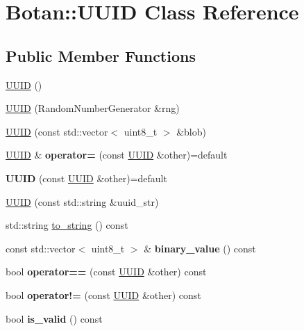 \hypertarget{class_botan_1_1_u_u_i_d}{}\section{Botan\+:\+:U\+U\+ID Class Reference}
\label{class_botan_1_1_u_u_i_d}
\subsection*{Public Member Functions}
\begin{DoxyCompactItemize}
\item 
\mbox{\hyperlink{class_botan_1_1_u_u_i_d_a1e8e37568ead09e587ca96cebcbab9d2}{U\+U\+ID}} ()
\item 
\mbox{\hyperlink{class_botan_1_1_u_u_i_d_a97713e2316b1c612813bb03c66dcbbb6}{U\+U\+ID}} (Random\+Number\+Generator \&rng)
\item 
\mbox{\hyperlink{class_botan_1_1_u_u_i_d_af2a8c7fb0ea61e9bb8c3a58a71c28724}{U\+U\+ID}} (const std\+::vector$<$ uint8\+\_\+t $>$ \&blob)
\item 
\mbox{\label{class_botan_1_1_u_u_i_d_aceb7c9bab4eb8a98b74d4ed2a8eb1f06}} 
\mbox{\hyperlink{class_botan_1_1_u_u_i_d}{U\+U\+ID}} \& {\bfseries operator=} (const \mbox{\hyperlink{class_botan_1_1_u_u_i_d}{U\+U\+ID}} \&other)=default
\item 
\mbox{\label{class_botan_1_1_u_u_i_d_a725aa36f808e73e45b4bec3c91a041a1}} 
{\bfseries U\+U\+ID} (const \mbox{\hyperlink{class_botan_1_1_u_u_i_d}{U\+U\+ID}} \&other)=default
\item 
\mbox{\hyperlink{class_botan_1_1_u_u_i_d_a621acc4dc66a8a330048588b23f61ae3}{U\+U\+ID}} (const std\+::string \&uuid\+\_\+str)
\item 
std\+::string \mbox{\hyperlink{class_botan_1_1_u_u_i_d_a707abb917ddb4996dbe987015cfac23c}{to\+\_\+string}} () const
\item 
\mbox{\label{class_botan_1_1_u_u_i_d_a023d13c5e0872b58fd0d05fe484b0d0a}} 
const std\+::vector$<$ uint8\+\_\+t $>$ \& {\bfseries binary\+\_\+value} () const
\item 
\mbox{\label{class_botan_1_1_u_u_i_d_a9c35447e4068df7b8e7c2cc60a09714d}} 
bool {\bfseries operator==} (const \mbox{\hyperlink{class_botan_1_1_u_u_i_d}{U\+U\+ID}} \&other) const
\item 
\mbox{\label{class_botan_1_1_u_u_i_d_a1989fbea9467d241c1f6374eb5d52042}} 
bool {\bfseries operator!=} (const \mbox{\hyperlink{class_botan_1_1_u_u_i_d}{U\+U\+ID}} \&other) const
\item 
\mbox{\label{class_botan_1_1_u_u_i_d_a3abdc23efc8636d2add2fb47eac0bfa2}} 
bool {\bfseries is\+\_\+valid} () const
\end{DoxyCompactItemize}



